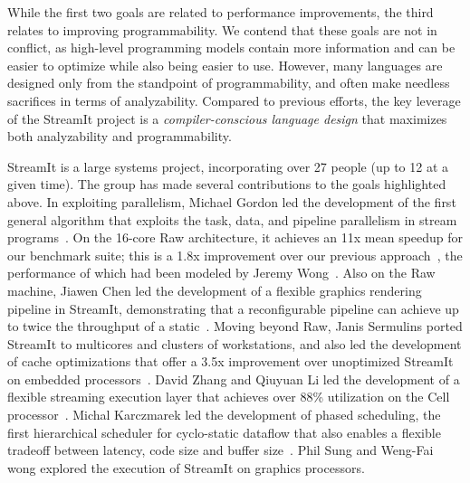 While the first two goals are related to performance improvements, the
third relates to improving programmability.  We contend that these
goals are not in conflict, as high-level programming models contain
more information and can be easier to optimize while also being easier
to use.  However, many languages are designed only from the standpoint
of programmability, and often make needless sacrifices in terms of
analyzability.  Compared to previous efforts, the key leverage of the
StreamIt project is a {\it compiler-conscious language design} that
maximizes both analyzability and programmability.


StreamIt is a large systems project, incorporating over 27 people (up
to 12 at a given time).  The group has made several contributions to
the goals highlighted above.  In exploiting parallelism, Michael
Gordon led the development of the first general algorithm that
exploits the task, data, and pipeline parallelism in stream
programs~\cite{gordon-asplos06}.  On the 16-core Raw architecture, it
achieves an 11x mean speedup for our benchmark suite; this is a 1.8x
improvement over our previous
approach~\cite{gordon-asplos02,gordon-thesis}, the performance of
which had been modeled by Jeremy Wong~\cite{wong-thesis}.  Also on the
Raw machine, Jiawen Chen led the development of a flexible graphics
rendering pipeline in StreamIt, demonstrating that a reconfigurable
pipeline can achieve up to twice the throughput of a
static~\cite{chen-graphics05,chen_load-balanced_2005}.  Moving beyond
Raw, Janis Sermulins ported StreamIt to multicores and clusters of
workstations, and also led the development of cache optimizations that
offer a 3.5x improvement over unoptimized StreamIt on embedded
processors~\cite{sermulins-lctes05,sermulins-thesis}.  David Zhang and
Qiuyuan Li led the development of a flexible streaming execution layer
that achieves over 88\% utilization on the Cell
processor~\cite{zhang_lightweight_2007,zhang-thesis}.  Michal
Karczmarek led the development of phased scheduling, the first
hierarchical scheduler for cyclo-static dataflow that also enables a
flexible tradeoff between latency, code size and buffer
size~\cite{karczmarek-lctes03,karczmarek-thesis}.  Phil Sung and
Weng-Fai wong explored the execution of StreamIt on graphics
processors.

